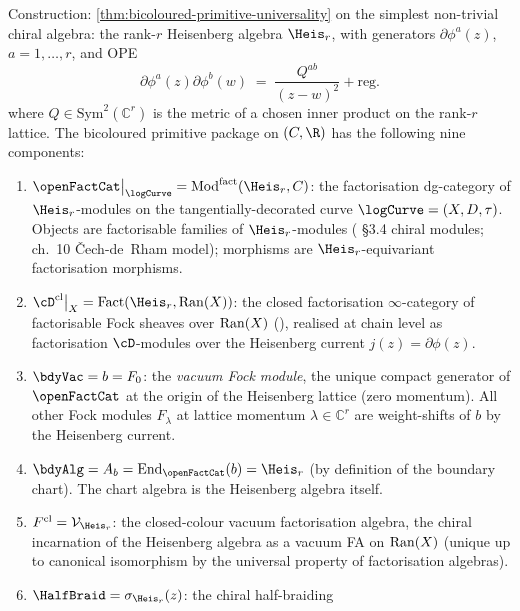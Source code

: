 \begin{example}
\label{ex:heisenberg-bicoloured-primitive-package}%
%
%
Construction: \cref{thm:bicoloured-primitive-universality} on the
simplest non-trivial chiral algebra: the rank-$r$ Heisenberg
algebra $\Heis_r$, with generators $\partial \phi^a(z)$,
$a = 1, \ldots, r$, and OPE
\[
\partial \phi^a(z) \partial \phi^b(w)
 \;=\; \frac{Q^{ab}}{(z - w)^2} + \mathrm{reg}.
\]
where $Q \in \mathrm{Sym}^2(\mathbb{C}^r)$ is the metric of a chosen
inner product on the rank-$r$ lattice. The bicoloured primitive
package on $(C, \R)$ has the following nine components:
\begin{enumerate}[label=\textup{(\roman*)}]
\item $\openFactCat\big|_{\logCurve} = \mathrm{Mod}^{\mathrm{fact}}(\Heis_r, C)$:
the factorisation dg-category of $\Heis_r$-modules on the
tangentially-decorated curve $\logCurve = (X, D, \tau)$. Objects
are factorisable families of $\Heis_r$-modules
\textup(\cite{BD04} \S 3.4 chiral modules; \cite{FBZ04} ch.~10
\v{C}ech-de~Rham model\textup); morphisms are $\Heis_r$-equivariant
factorisation morphisms.
\item $\cD^{\mathrm{cl}}\big|_X = \mathrm{Fact}(\Heis_r, \Ran(X))$:
the closed factorisation $\infty$-category of factorisable Fock
sheaves over $\mathrm{Ran}(X)$ \textup(\cite{FG12}\textup), realised at chain
level as factorisation $\cD$-modules over the Heisenberg current
$j(z) = \partial \phi(z)$.
\item $\bdyVac = b = F_0$: the \emph{vacuum Fock module}, the
unique compact generator of $\openFactCat$ at the origin of the
Heisenberg lattice (zero momentum). All other Fock modules
$F_\lambda$ at lattice momentum $\lambda \in \mathbb{C}^r$ are
weight-shifts of $b$ by the Heisenberg current.
\item $\bdyAlg = A_b = \mathrm{End}_{\openFactCat}(b)
= \Heis_r$ \textup(by definition of the boundary chart\textup).
The chart algebra is the Heisenberg algebra itself.
\item $F^{\mathrm{cl}} = \mathcal{V}_{\Heis_r}$: the closed-colour
vacuum factorisation algebra, the chiral incarnation of the
Heisenberg algebra as a vacuum FA on $\mathrm{Ran}(X)$ \textup(unique up to
canonical isomorphism by the universal property of factorisation
algebras\textup).
\item $\HalfBraid = \sigma_{\Heis_r}(z)$: the chiral half-braiding

\end{enumerate}
\end{example}

